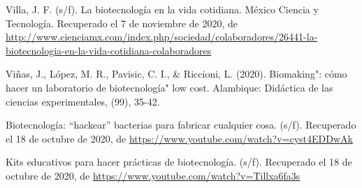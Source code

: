 \documentclass[12pt]{article}
\begin{document}
\begin{thebibliography}{X}
	 Villa, J. F. (s/f). La biotecnología en la vida cotidiana. México Ciencia y Tecnología. Recuperado el 7 de noviembre de 2020, de \url{http://www.cienciamx.com/index.php/sociedad/colaboradores/26441-la-biotecnologia-en-la-vida-cotidiana-colaboradores}

	 Viñas, J., López, M. R., Pavisic, C. I., \& Riccioni, L. (2020). Biomaking": cómo hacer un laboratorio de biotecnología" low cost. Alambique: Didáctica de las ciencias experimentales, (99), 35-42.
	
	 Biotecnología: “hackear” bacterias para fabricar cualquier cosa. (s/f). Recuperado el 18 de octubre de 2020, de \url{https://www.youtube.com/watch?v=cyst4EDDwAk}
	
	 Kits educativos para hacer prácticas de biotecnología. (s/f). Recuperado el 18 de octubre de 2020, de \url{https://www.youtube.com/watch?v=Tillxa6fa3s}

\end{thebibliography}


\appendix\newpage
\end{document}

